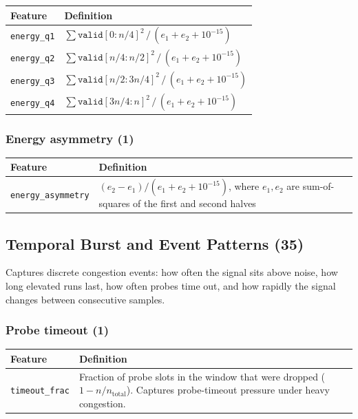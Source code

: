 \documentclass[11pt,a4paper]{article}
\begin{document}
\begin{tabular}{@{}lp{10cm}@{}}
\toprule
\textbf{Feature} & \textbf{Definition} \\
\midrule
\texttt{energy\_q1} & $\sum \texttt{valid}[0:n/4]^2 \,/\, (e_1 + e_2 + 10^{-15})$ \\
\texttt{energy\_q2} & $\sum \texttt{valid}[n/4:n/2]^2 \,/\, (e_1 + e_2 + 10^{-15})$ \\
\texttt{energy\_q3} & $\sum \texttt{valid}[n/2:3n/4]^2 \,/\, (e_1 + e_2 + 10^{-15})$ \\
\texttt{energy\_q4} & $\sum \texttt{valid}[3n/4:n]^2 \,/\, (e_1 + e_2 + 10^{-15})$ \\
\bottomrule
\end{tabular}

\subsubsection*{Energy asymmetry (1)}

\begin{tabular}{@{}lp{10cm}@{}}
\toprule
\textbf{Feature} & \textbf{Definition} \\
\midrule
\texttt{energy\_asymmetry} & $(e_2 - e_1) / (e_1 + e_2 + 10^{-15})$, where $e_1, e_2$ are sum-of-squares of the first and second halves \\
\bottomrule
\end{tabular}

\subsection{Temporal Burst and Event Patterns (35)}

Captures discrete congestion events: how often the signal sits above noise,
how long elevated runs last, how often probes time out, and how rapidly the
signal changes between consecutive samples.

\subsubsection*{Probe timeout (1)}

\begin{tabular}{@{}lp{10cm}@{}}
\toprule
\textbf{Feature} & \textbf{Definition} \\
\midrule
\texttt{timeout\_frac} & Fraction of probe slots in the window that were dropped ($1 - n / n_{\text{total}}$). Captures probe-timeout pressure under heavy congestion. \\
\bottomrule
\end{tabular}
\end{document}
